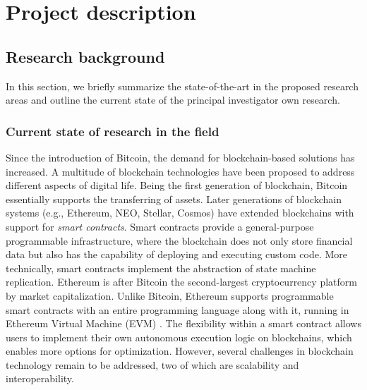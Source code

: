 \newpage
\setcounter{page}{1}
\section{Project description}

\subsection{Research background}

In this section, we briefly summarize the state-of-the-art in the proposed
research areas and outline the current state of the principal investigator own
research.

\subsubsection{Current state of research in the field}

Since the introduction of Bitcoin, the demand for blockchain-based solutions has increased. 
A multitude of blockchain technologies have been proposed to address different aspects of digital life. 
Being the first generation of
blockchain, Bitcoin essentially supports the transferring of assets.
Later generations of blockchain systems (e.g., Ethereum, NEO, Stellar, Cosmos) have extended blockchains with support
for \emph{smart contracts}.
Smart contracts provide a general-purpose programmable infrastructure, where
the blockchain does not only store financial data but also has the capability
of deploying and executing custom code. 
More technically, smart contracts implement the abstraction of state machine replication.
Ethereum is after Bitcoin the second-largest cryptocurrency platform by market
capitalization. Unlike Bitcoin, Ethereum supports programmable smart contracts
with an entire programming language along with it, running in Ethereum Virtual
Machine (EVM) \cite{ethereum:evm}. The flexibility within a smart contract
allows users to implement their own autonomous execution logic on blockchains,
which enables more options for optimization. However, several challenges in blockchain
technology remain to be addressed, two of which are scalability and
interoperability.

